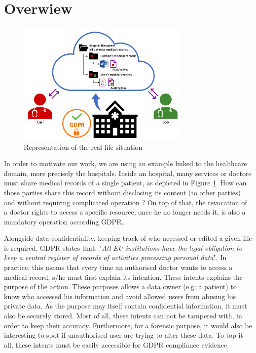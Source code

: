 \documentclass[../main.tex]{subfiles}
\begin{document}
\section{Overwiew}
\label{section:problem:overview}

\begin{figure}[h]
    \centering
    \includegraphics[width=0.75\textwidth]{images/problem/overview}
    
    \caption{Representation of the real life situation}
    \label{figure:problem:overview}
\end{figure}

\par In order to motivate our work, we are using an example linked to the healthcare domain, more precisely the hospitals. Inside an hospital, many services or doctors must share medical records of a single patient, as depicted in Figure \ref{figure:problem:overview}. How can those parties share this record without disclosing its content (to other parties) and without requiring complicated operation ? On top of that, the revocation of a doctor rights to access a specific resource, once he no longer needs it, is also a mandatory operation according GDPR.

\medbreak
\par Alongside data confidentiality, keeping track of who accessed or edited a given file is required. GDPR states that: "\textit{All EU institutions have the legal obligation to keep a central register of records of activities processing personal data}". In practice, this means that every time an authorised doctor wants to access a medical record, s/he must first explain its intention. These intents explains the purpose of the action. These purposes allows a data owner (e.g: a patient) to know who accessed his information and avoid allowed users from abusing his private data. As the purpose may itself contain confidential information, it must also be securely stored. Most of all, these intents can not be tampered with, in order to keep their accuracy. Furthermore, for a forensic purpose, it would also be interesting to spot if unauthorised user are trying to alter these data. To top it all, these intents must be easily accessible for GDPR compliance evidence.
\end{document}
